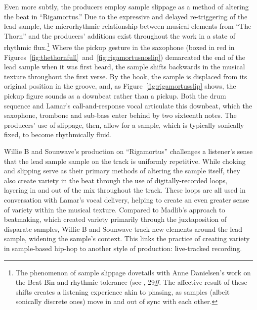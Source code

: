 Even more subtly, the producers employ sample slippage as a method of altering the beat in ``Rigamortus.'' Due to the expressive and delayed re-triggering of the lead sample, the microrhythmic relationship between musical elements from ``The Thorn'' and the producers' additions exist throughout the work in a state of rhythmic flux.\footnote{The phenomenon of sample slippage dovetails with Anne Danielsen's work on the Beat Bin and rhythmic tolerance (see \cite{annedanielsenHereThereEverywhere2016}, 29\textit{ff}. The affective result of these shifts creates a listening experience akin to phasing, as samples (albeit sonically discrete ones) move in and out of sync with each other.} Where the pickup gesture in the saxophone (boxed in red in Figures~\ref{fig:thethornfull}~and~\ref{fig:rigamortusnoslip}) demarcated the end of the lead sample when it was first heard, the sample shifts backwards in the musical texture throughout the first verse. By the hook, the sample is displaced from its original position in the groove, and, as Figure~\ref{fig:rigamortusslip} shows, the pickup figure sounds as a downbeat rather than a pickup. Both the drum sequence and Lamar's call-and-response vocal articulate this downbeat, which the saxophone, trombone and sub-bass enter behind by two sixteenth notes. The producers' use of slippage, then, allow for a sample, which is typically sonically fixed, to become rhythmically fluid.

Willie B and Sounwave's production on ``Rigamortus'' challenges a listener's sense that the lead sample sample on the track is uniformly repetitive. While choking and slipping serve as their primary methods of altering the sample itself, they also create variety in the beat through the use of digitally-recorded loops, layering in and out of the mix throughout the track. These loops are all used in conversation with Lamar's vocal delivery, helping to create an even greater sense of variety within the musical texture. Compared to Madlib's approach to beatmaking, which created variety primarily through the juxtaposition of disparate samples, Willie B and Sounwave track new elements around the lead sample, widening the sample's context. This links the practice of creating variety in sample-based hip-hop to another style of production: live-tracked recording.


